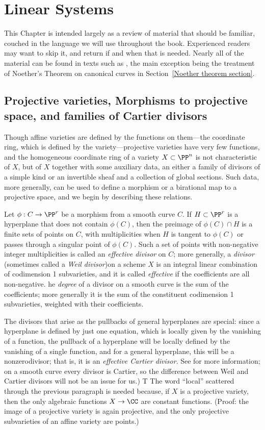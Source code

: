 

\chapter{Linear Systems}
This Chapter is intended largely as a review of material that should be familiar, couched in the language we will use throughout the book. Experienced readers 
may want to skip it, and return if and when that is needed. Nearly all of the material can be found in texts such as \cite{H}, the main exception being the treatment of
Noether's Theorem on canonical curves in Section~\ref{Noether theorem section}.

\section{Projective varieties, Morphisms to projective space, and families of Cartier divisors}

Though affine varieties are defined by the functions on them---the coordinate ring, which is defined by the variety---projective varieties have very few functions, and
the homogeneous coordinate ring of a variety $X\subset \PP^n$ is not characteristic of $X$, but of $X$ together with some auxiliary data, an 
either a family of divisors of a simple kind or an invertible sheaf and a collection of global sections. Such data, more generally, can be used to define a morphism or a birational map
to a projective space, and we begin by describing these relations.

Let $\phi: C\to \PP^{r}$ be a morphism from a smooth curve $C$. If $H\subset \PP^r$ is a hyperplane that does not contain $\phi(C)$, then the preimage of $\phi(C)\cap H$ is a finite sets of points on $C$, with multiplicities when $H$ is tangent to $\phi(C)$ or passes through a singular point of $\phi(C)$. Such a set of points with non-negative integer multiplicities is called an \emph{effective divisor} on $C$; more generally, a \emph{divisor} (sometimes called a \emph{Weil divisor})on a scheme $X$ is an integral linear combination of codimension 1 subvarieties, and it is called \emph{effective} if the coefficients are all non-negative. he \emph{degree} of a divisor on a smooth curve
is the sum of the coefficients; more generally it is the sum of the constituent codimension 1 subvarieties, weighted with their coefficients. 

The divisors that arise as the pullbacks of general hyperplanes are special: since a hyperplane is defined by just one equation, which is locally given by the vanishing of a function, the pullback of a hyperplane will be locally defined by the vanishing of a single function,
and for a general hyperplane, this will be a nonzerodivisor; that is, it is an  \emph{effective Cartier divisor}. See \cite[pp. 140-146]{H} for more information; on a smooth curve every divisor is Cartier, so the difference between Weil and Cartier divisors will not be an issue for us.) T
The  word ``local'' scattered through the previous paragraph is needed because, if $X$ is a projective variety, then the only algebraic functions $X\to \CC$ are constant functions. (Proof: the image of a projective variety
is again projective, and the only projective subvarieties of an affine variety are points.)

